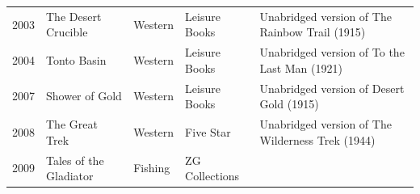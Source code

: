 \documentclass{article}
\begin{document}
\begin{tabular}{lllll}
2003 & The Desert Crucible & Western & Leisure Books & Unabridged version of The Rainbow Trail (1915) \\
2004 & Tonto Basin & Western & Leisure Books & Unabridged version of To the Last Man (1921) \\
2007 & Shower of Gold & Western & Leisure Books & Unabridged version of Desert Gold (1915) \\
2008 & The Great Trek & Western & Five Star & Unabridged version of The Wilderness Trek (1944) \\
2009 & Tales of the Gladiator & Fishing & ZG Collections &  \\
\bottomrule
\end{tabular}
\end{document}
